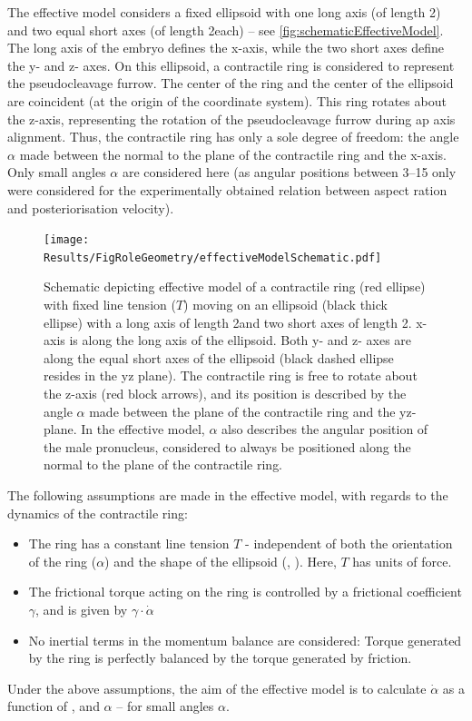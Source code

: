 The effective model considers a fixed ellipsoid with one long axis (of length 2\longAxisLength) and two equal short axes (of length 2\shortAxisLength each) -- see \autoref{fig:schematicEffectiveModel}. The long axis of the embryo defines the x-axis, while the two short axes define the y- and z- axes. On this ellipsoid, a contractile ring is considered to represent the pseudocleavage furrow. The center of the ring and the center of the ellipsoid are coincident (at the origin of the coordinate system). This ring rotates about the z-axis, representing the rotation of the pseudocleavage furrow during \ac{ap} axis alignment. Thus, the contractile ring has only a sole degree of freedom: the angle $\alpha$ made between the normal to the plane of the contractile ring and the x-axis. Only small angles $\alpha$ are considered here (as angular positions between \SIrange{3}{15}{\unitAngle} only were considered for the experimentally obtained relation between aspect ration and posteriorisation velocity).

\begin{figure}
    \centering
    \texttt{[image: Results/FigRoleGeometry/effectiveModelSchematic.pdf]}
    \caption[Schematic of effective model of a contractile ring on an ellipsoid]{Schematic depicting effective model of a contractile ring (red ellipse) with fixed line tension ($T$) moving on an ellipsoid (black thick ellipse) with a long axis of length 2\longAxisLength and two short axes of length 2\shortAxisLength. x-axis is along the long axis of the ellipsoid. Both y- and z- axes are along the equal short axes of the ellipsoid (black dashed ellipse resides in the yz plane). The contractile ring is free to rotate about the z-axis (red block arrows), and its position is described by the angle $\alpha$ made between the plane of the contractile ring and the yz-plane. In the effective model, $\alpha$ also describes the angular position of the male pronucleus, considered to always be positioned along the normal to the plane of the contractile ring.}
    \label{fig:schematicEffectiveModel}
\end{figure}

The following assumptions are made in the effective model, with regards to the dynamics of the contractile ring:
\begin{itemize}
    \item The ring has a constant line tension $T$ - independent of both the orientation of the ring ($\alpha$) and the shape of the ellipsoid (\longAxisLength, \shortAxisLength). Here, $T$ has units of force.
    \item The frictional torque acting on the ring is controlled by a frictional coefficient $\gamma$, and is given by $\gamma\cdot\dot{\alpha}$
    \item No inertial terms in the momentum balance are considered: Torque generated by the ring is perfectly balanced by the torque generated by friction.
\end{itemize}                                                                             
Under the above assumptions, the aim of the effective model is to calculate $\dot{\alpha}$ as a function of \longAxisLength, \shortAxisLength and $\alpha$ -- for small angles $\alpha$. 

